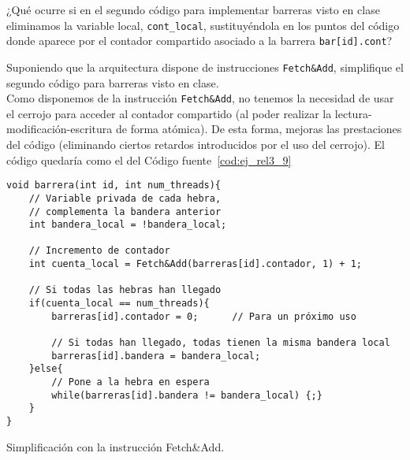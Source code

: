 \begin{ejercicio}
    ¿Qué ocurre si en el segundo código para implementar barreras visto en clase eliminamos la variable local, \verb|cont_local|, sustituyéndola en los puntos del código donde aparece por el contador compartido asociado a la barrera \verb|bar[id].cont|?
\end{ejercicio}

\begin{ejercicio}
    Suponiendo que la arquitectura dispone de instrucciones \verb|Fetch&Add|, simplifique el segundo código para barreras visto en clase.\\

    Como disponemos de la instrucción \verb|Fetch&Add|, no tenemos la necesidad de usar el cerrojo para acceder al contador compartido (al poder realizar la lectura-modificación-escritura de forma atómica). De esta forma, mejoras las prestaciones del código (eliminando ciertos retardos introducidos por el uso del cerrojo). El código quedaría como el del Código fuente~\ref{cod:ej_rel3_9}

\begin{listing}[H]
\begin{verbatim}
void barrera(int id, int num_threads){
    // Variable privada de cada hebra,
    // complementa la bandera anterior
    int bandera_local = !bandera_local;

    // Incremento de contador
    int cuenta_local = Fetch&Add(barreras[id].contador, 1) + 1;

    // Si todas las hebras han llegado
    if(cuenta_local == num_threads){
        barreras[id].contador = 0;      // Para un próximo uso

        // Si todas han llegado, todas tienen la misma bandera local
        barreras[id].bandera = bandera_local;
    }else{
        // Pone a la hebra en espera
        while(barreras[id].bandera != bandera_local) {;}
    }
}
\end{verbatim}
\caption{Simplificación con la instrucción Fetch\&Add.}
\label{cod:ej_rel3_9}
\end{listing}

\end{ejercicio}

